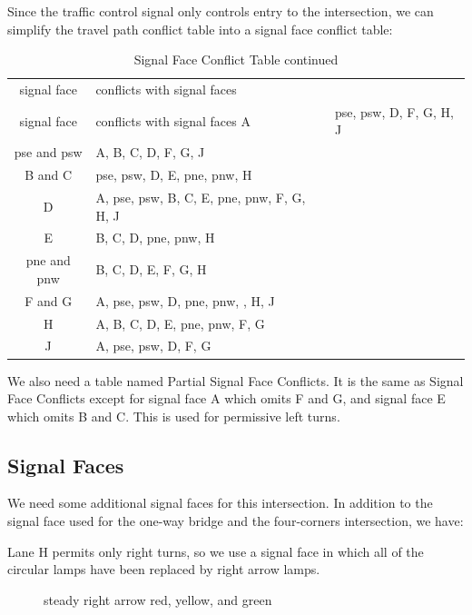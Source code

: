 \documentclass[letterpaper,twoside]{article}
\begin{document}
Since the traffic control signal only controls entry to the
intersection, we can simplify the travel path conflict table into a signal face
conflict table:

\begin{longtable}{c | l}
  \caption{Signal Face Conflict Table} \\
  signal face & conflicts with signal faces \endfirsthead
  \caption{Signal Face Conflict Table continued} \\
  signal face & conflicts with signal faces \endhead
  \hline
  A & pse, psw, D, F, G, H, J \\
  pse and psw & A, B, C, D, F, G, J \\
  B and C & pse, psw, D, E, pne, pnw, H \\
  D & A, pse, psw, B, C, E, pne, pnw, F, G, H, J \\
  E & B, C, D, pne, pnw, H \\
  pne and pnw & B, C, D, E, F, G, H \\
  F and G & A, pse, psw, D, pne, pnw, , H, J \\
  H & A, B, C, D, E, pne, pnw, F, G \\
  J & A, pse, psw, D, F, G \\
\end{longtable}

We also need a table named Partial Signal Face Conflicts.  It is the same
as Signal Face Conflicts except for signal face A which omits F and G,
and signal face E which omits B and C.  This is used for permissive
left turns.

\subsection{Signal Faces}

We need some additional signal faces for this intersection.  In addition
to the signal face used for the one-way bridge and the four-corners
intersection, we have:

Lane H permits only right turns, so we use a signal face in which all of
the circular lamps have been replaced by right arrow lamps.

\begin{figure}[H]
           {\caption{steady right arrow red, yellow, and
               green}\label{fig:signal_rrr}}
\end{figure}
\end{document}
